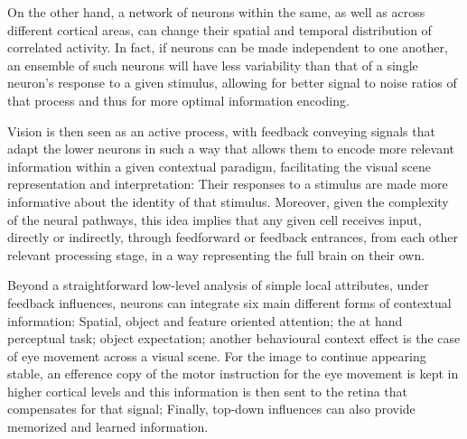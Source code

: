 On the other hand, a network of neurons within the same, as well as across different cortical areas, can change their spatial and temporal distribution of correlated activity. In fact, if neurons can be made independent to one another, an ensemble of such neurons will have less variability than that of a single neuron's response to a given stimulus, allowing for better signal to noise ratios of that process and thus for more optimal information encoding.

Vision is then seen as an active process, with feedback conveying signals that adapt the lower neurons in such a way that allows them to encode more relevant information within a given contextual paradigm, facilitating the visual scene representation and interpretation: Their responses to a stimulus are made more informative about the identity of that stimulus. Moreover, given the complexity of the neural pathways, this idea implies that any given cell receives input, directly or indirectly, through feedforward or feedback entrances, from each other relevant processing stage, in a way representing the full brain on their own.


Beyond a straightforward low-level analysis of simple local attributes, under feedback influences, neurons can integrate six main different forms of contextual information: Spatial, object and feature oriented attention; the at hand perceptual task; object expectation; another behavioural context effect is the case of eye movement across a visual scene. For the image to continue appearing stable, an efference copy of the motor instruction for the eye movement is kept in higher cortical levels and this information is then sent to the retina that compensates for that signal; Finally, top-down influences can also provide memorized and learned information. 


